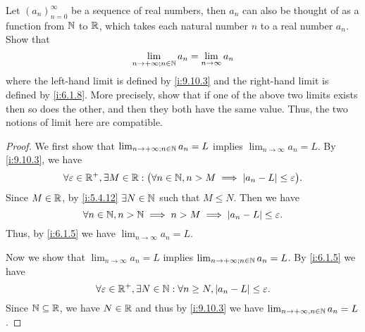 \exercisesection

\begin{ex}\label{i:ex:9.10.1}
  Let \((a_n)_{n = 0}^\infty\) be a sequence of real numbers, then \(a_n\) can also be thought of as a function from \(\mathbb{N}\) to \(\mathbb{R}\), which takes each natural number \(n\) to a real number \(a_n\).
  Show that
  \[
    \lim_{n \to +\infty ; n \in \mathbb{N}} a_n = \lim_{n \to \infty} a_n
  \]
  where the left-hand limit is defined by \cref{i:9.10.3} and the right-hand limit is defined by \cref{i:6.1.8}.
  More precisely, show that if one of the above two limits exists then so does the other, and then they both have the same value.
  Thus, the two notions of limit here are compatible.
\end{ex}

\begin{proof}
  We first show that \(\lim_{n \to +\infty ; n \in \mathbb{N}} a_n = L\) implies \(\lim_{n \to \infty} a_n = L\).
  By \cref{i:9.10.3}, we have
  \[
    \forall \varepsilon \in \mathbb{R}^+, \exists M \in \mathbb{R} : \big(\forall n \in \mathbb{N}, n > M \implies \left\lvert a_n - L\right\rvert \leq \varepsilon\big).
  \]
  Since \(M \in \mathbb{R}\), by \cref{i:5.4.12} \(\exists N \in \mathbb{N}\) such that \(M \leq N\).
  Then we have
  \[
    \forall n \in \mathbb{N}, n > \mathbb{N} \implies n > M \implies \left\lvert a_n - L\right\rvert \leq \varepsilon.
  \]
  Thus, by \cref{i:6.1.5} we have \(\lim_{n \to \infty} a_n = L\).

  Now we show that \(\lim_{n \to \infty} a_n = L\) implies \(\lim_{n \to +\infty ; n \in \mathbb{N}} a_n = L\).
  By \cref{i:6.1.5} we have
  \[
    \forall \varepsilon \in \mathbb{R}^+, \exists N \in \mathbb{N} : \forall n \geq N, \left\lvert a_n - L\right\rvert \leq \varepsilon.
  \]
  Since \(\mathbb{N} \subseteq \mathbb{R}\), we have \(N \in \mathbb{R}\) and thus by \cref{i:9.10.3} we have \(\lim_{n \to +\infty, n \in \mathbb{N}} a_n = L\).
\end{proof}
